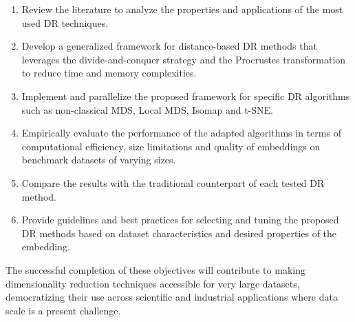 \begin{enumerate}
    \item Review the literature to analyze the properties and applications of the most used DR techniques.
    \item Develop a generalized framework for distance-based DR methods that leverages the divide-and-conquer strategy and the Procrustes transformation to reduce time and memory complexities.
    \item Implement and parallelize the proposed framework for specific DR algorithms such as non-classical MDS, Local MDS, Isomap and t-SNE.
    \item Empirically evaluate the performance of the adapted algorithms in terms of computational efficiency, size limitations and quality of embeddings on benchmark datasets of varying sizes.
    \item Compare the results with the traditional counterpart of each tested DR method.
    \item Provide guidelines and best practices for selecting and tuning the proposed DR methods based on dataset characteristics and desired properties of the embedding.
\end{enumerate}

The successful completion of these objectives will contribute to making  dimensionality reduction techniques accessible for very large datasets, democratizing their use across scientific and industrial applications where data scale is a present challenge.